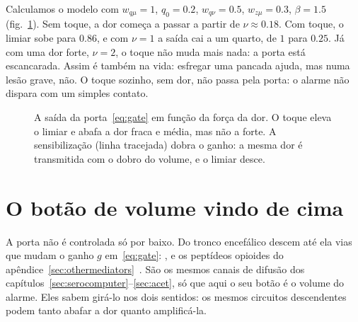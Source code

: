 Calculamos o modelo com $w_{q\mu}=1$, $q_0=0.2$, $w_{q\nu}=0.5$, $w_{z\mu}=0.3$, $\beta=1.5$ (fig.~\ref{fig:gatecurves}). Sem toque, a dor começa a passar a partir de $\nu\approx0.18$. Com toque, o limiar sobe para $0.86$, e com $\nu=1$ a saída cai a um quarto, de $1$ para $0.25$. Já com uma dor forte, $\nu=2$, o toque não muda mais nada: a porta está escancarada. Assim é também na vida: esfregar uma pancada ajuda, mas numa lesão grave, não. O toque sozinho, sem dor, não passa pela porta: o alarme não dispara com um simples contato.

\begin{figure}[t]
\centering
{}
\caption{A saída da porta~\eqref{eq:gate} em função da força da dor. O toque eleva o limiar e abafa a dor fraca e média, mas não a forte. A sensibilização (linha tracejada) dobra o ganho: a mesma dor é transmitida com o dobro do volume, e o limiar desce.}
\label{fig:gatecurves}
\end{figure}

\section{O botão de volume vindo de cima}

A porta não é controlada só por baixo. Do tronco encefálico descem até ela vias que mudam o ganho $g$ em~\eqref{eq:gate}: ,  e os peptídeos opioides do apêndice~\ref{sec:othermediators}~\cite{Fields2004}. São os mesmos canais de difusão dos capítulos~\ref{sec:serocomputer}--\ref{sec:acet}, só que aqui o seu botão é o volume do alarme. Eles sabem girá-lo nos dois sentidos: os mesmos circuitos descendentes podem tanto abafar a dor quanto amplificá-la.

